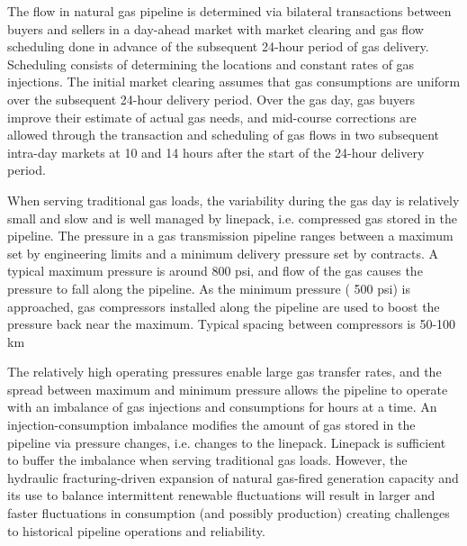 \documentclass[10pt, conference, compsocconf]{IEEEtran}
\begin{document}
The flow in natural gas pipeline is determined via bilateral transactions between buyers and sellers in a day-ahead market with market clearing and gas flow scheduling done in advance of the subsequent 24-hour period of gas delivery.  Scheduling consists of determining the locations and constant rates of gas injections. The initial market clearing assumes that gas consumptions are uniform over the subsequent 24-hour delivery period. Over the gas day, gas buyers improve their estimate of actual gas needs, and mid-course corrections are allowed through the transaction and scheduling of gas flows in two subsequent intra-day markets at 10 and 14 hours after the start of the 24-hour delivery period.

When serving traditional gas loads, the variability during the gas day is relatively small and slow and is well managed by linepack, i.e. compressed gas stored in the pipeline. The pressure in a gas transmission pipeline ranges between a maximum set by engineering limits and a minimum delivery pressure set by contracts.  A typical maximum pressure is around 800 psi, and flow of the gas causes the pressure to fall along the pipeline. As the minimum pressure ( 500 psi) is approached, gas compressors installed along the pipeline are used to boost the pressure back near the maximum. Typical spacing between compressors is  50-100 km

The relatively high operating pressures enable large gas transfer rates, and the spread between maximum and minimum pressure allows the pipeline to operate with an imbalance of gas injections and consumptions for hours at a time.  An injection-consumption imbalance modifies the amount of gas stored in the pipeline via pressure changes, i.e. changes to the linepack.  Linepack is sufficient to buffer the imbalance when serving traditional gas loads. However, the hydraulic fracturing-driven expansion of natural gas-fired generation capacity \cite{10CWB} and its use to balance intermittent renewable fluctuations will result in larger and faster fluctuations in consumption (and possibly production) creating challenges to historical pipeline operations and reliability.
\end{document}
